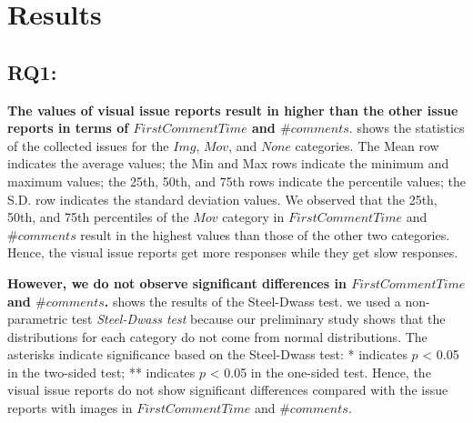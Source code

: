 \section{Results}
\label{sec:results}



% 





\subsection{RQ1: \RQone{}}
\textbf{The values of visual issue reports 
result in higher than the other issue reports 
in terms of $FirstCommentTime$ and $\#comments$}. 
 shows the statistics
of the collected issues for the $Img$, $Mov$,
and $None$ categories.
The Mean row indicates the average values; 
the Min and Max rows indicate the minimum and maximum values; 
the 25th, 50th, and 75th rows indicate the percentile values; 
the S.D. row indicates the standard deviation values. 
We observed that the 25th, 50th, and 75th percentiles of 
the $Mov$ category in $FirstCommentTime$ and $\#comments$ 
result in the highest values than those of 
the other two categories.
Hence, the visual issue reports get more responses 
while they get slow responses. 

\textbf{However, we do not observe 
significant differences in $FirstCommentTime$ and $\#comments$.}
 shows the results of 
the Steel-Dwass test. 
we used a non-parametric test \textit{Steel-Dwass test}
because our preliminary study shows that 
the distributions for each category do not 
come from normal distributions.
The asterisks indicate significance based on 
the Steel-Dwass test: * indicates $p$ < 0.05 in 
the two-sided test; 
** indicates $p$ < 0.05 in the one-sided test. 
Hence, the visual issue reports do not show 
significant differences compared with 
the issue reports with images in 
$FirstCommentTime$ and $\#comments$.

